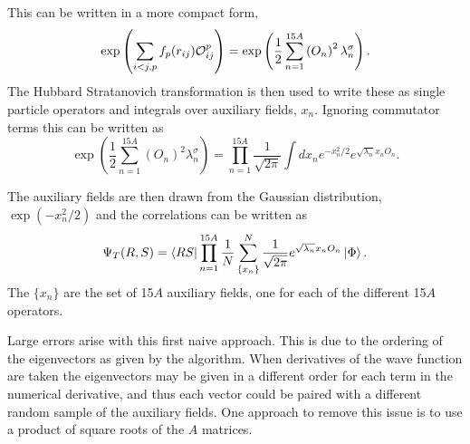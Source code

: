 This can be written in a more compact form,
\begin{equation}
    \exp\left(\sum\limits_{i<j,p}f_p(r_{ij})\mathcal{O}^p_{ij}\right) = \exp\left(\frac{1}{2}\sum\limits_{n=1}^{15A} \left(O_{n}\right)^2 \lambda_n^{\sigma}\right).
\end{equation}
The Hubbard Stratanovich transformation is then used to write these as single particle operators and integrals over auxiliary fields, $x_n$. Ignoring commutator terms this can be written as
\begin{equation}
   \exp\left(\frac{1}{2}\sum\limits_{n=1}^{15A} \left(O_{n}\right)^2 \lambda_n^{\sigma}\right) = \prod\limits_{n=1}^{15A} \frac{1}{\sqrt{2\pi}}\int dx_n e^{-x_n^2/2}e^{\sqrt{\lambda_n}x_nO_n}.
\end{equation}

The auxiliary fields are then drawn from the Gaussian distribution, $\exp\left(-x_n^2/2\right)$ and the correlations can be written as
\begin{equation}
   \Psi_T(R,S) = \left< RS \right|\prod\limits_{n=1}^{15A} \frac{1}{N} \sum\limits_{\{x_n\}}^N\frac{1}{\sqrt{2\pi}}e^{\sqrt{\lambda_n}x_nO_n}\left| \Phi \right>.
\end{equation}
The $\{x_n\}$ are the set of 15$A$ auxiliary fields, one for each of the different 15$A$ operators.

Large errors arise with this first naive approach. This is due to the ordering of the eigenvectors as given by the algorithm. When derivatives of the wave function are taken the eigenvectors may be given in a different order for each term in the numerical derivative, and thus each vector could be paired with a different random sample of the auxiliary fields. One approach to remove this issue is to use a product of square roots of the $A$ matrices.

